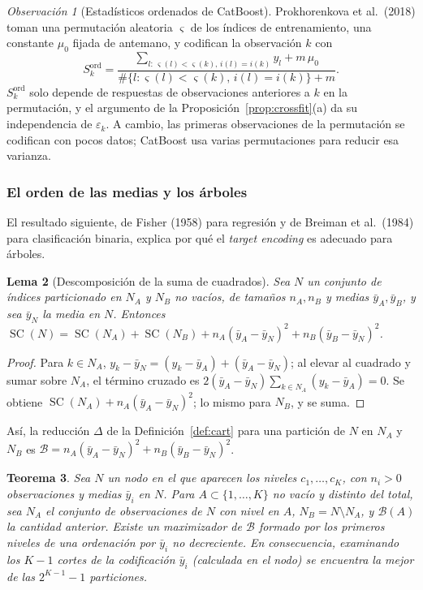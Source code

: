 \documentclass[11pt,a4paper]{article}
\theoremstyle{plain}
\newtheorem{teorema}{Teorema}[section]
\newtheorem{lema}[teorema]{Lema}
\theoremstyle{definition}
\theoremstyle{remark}
\newtheorem{observacion}[teorema]{Observación}
\newcommand{\SC}{\operatorname{SC}}
\newcommand{\1}{\mathbf{1}}
\begin{document}
\begin{observacion}[Estadísticos ordenados de CatBoost]
Prokhorenkova et al.\ (2018) toman una permutación aleatoria
$\varsigma$ de los índices de entrenamiento, una constante $\mu_0$ fijada
de antemano, y codifican la observación $k$ con
\[
S^{\mathrm{ord}}_k=\frac{\sum_{l:\,\varsigma(l)<\varsigma(k),\,i(l)=i(k)}y_l+m\,\mu_0}{\#\{l:\varsigma(l)<\varsigma(k),\,i(l)=i(k)\}+m}.
\]
$S^{\mathrm{ord}}_k$ solo depende de respuestas de observaciones
anteriores a $k$ en la permutación, y el argumento de la
Proposición~\ref{prop:crossfit}(a) da su independencia de $\varepsilon_k$.
A cambio, las primeras observaciones de la permutación se codifican con
pocos datos; CatBoost usa varias permutaciones para reducir esa varianza.
\end{observacion}

\subsubsection{El orden de las medias y los árboles}

El resultado siguiente, de Fisher (1958) para regresión y de Breiman et
al.\ (1984) para clasificación binaria, explica por qué el \emph{target
encoding} es adecuado para árboles.

\begin{lema}[Descomposición de la suma de cuadrados]\label{lem:anova}
Sea $N$ un conjunto de índices particionado en $N_A$ y $N_B$ no vacíos,
de tamaños $n_A,n_B$ y medias $\bar y_A,\bar y_B$, y sea $\bar y_N$ la
media en $N$. Entonces
$\SC(N)=\SC(N_A)+\SC(N_B)+n_A(\bar y_A-\bar y_N)^2+n_B(\bar y_B-\bar y_N)^2$.
\end{lema}

\begin{proof}
Para $k\in N_A$, $y_k-\bar y_N=(y_k-\bar y_A)+(\bar y_A-\bar y_N)$; al
elevar al cuadrado y sumar sobre $N_A$, el término cruzado es
$2(\bar y_A-\bar y_N)\sum_{k\in N_A}(y_k-\bar y_A)=0$. Se obtiene
$\SC(N_A)+n_A(\bar y_A-\bar y_N)^2$; lo mismo para $N_B$, y se suma.
\end{proof}

Así, la reducción $\Delta$ de la Definición~\ref{def:cart} para una
partición de $N$ en $N_A$ y $N_B$ es
$\mathcal B=n_A(\bar y_A-\bar y_N)^2+n_B(\bar y_B-\bar y_N)^2$.

\begin{teorema}\label{teo:fisher}
Sea $N$ un nodo en el que aparecen los niveles $c_1,\dots,c_K$, con
$n_i>0$ observaciones y medias $\bar y_i$ en $N$. Para $A\subset\{1,\dots,K\}$
no vacío y distinto del total, sea $N_A$ el conjunto de observaciones de
$N$ con nivel en $A$, $N_B=N\setminus N_A$, y $\mathcal B(A)$ la cantidad
anterior. Existe un maximizador de $\mathcal B$ formado por los primeros
niveles de una ordenación por $\bar y_i$ no decreciente. En consecuencia,
examinando los $K-1$ cortes de la codificación $\bar y_i$ (calculada en
el nodo) se encuentra la mejor de las $2^{K-1}-1$ particiones.
\end{teorema}
\end{document}
